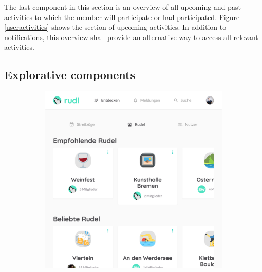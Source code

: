 \documentclass[12pt,numbers=noenddot,parskip,bibliography=totocnumbered,listof=totocnumbered,draft]{scrreprt}
\begin{document}
The last component in this section is an overview of all upcoming and past activities to which the member will participate or had participated. Figure \ref{useractivities} shows the section of upcoming activities. In addition to notifications, this overview shall provide an alternative way to access all relevant activities.

\subsection{Explorative components}
\begin{figure}
\begin{subfigure}[t]{0.45\textwidth}%
\centering
\includegraphics[width=\linewidth]{exploreinterestgroups.png}
\caption{}
\label{exploreinterestgroups}
\end{subfigure}%
\hfill
\begin{subfigure}[t]{0.45\textwidth}%
\centering

\end{subfigure}
\end{figure}
\end{document}
